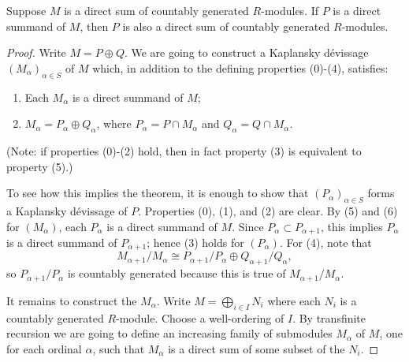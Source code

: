 \begin{theorem}
\label{theorem-kaplansky-direct-sum}
Suppose $M$ is a direct sum of countably generated $R$-modules.  If $P$ is a
direct summand of $M$, then $P$ is also a direct sum of countably generated
$R$-modules.
\end{theorem}

\begin{proof}
Write $M = P \oplus Q$.  We are going to construct a Kaplansky d\'evissage
$(M_{\alpha})_{\alpha \in S}$ of $M$ which, in addition to the defining
properties (0)-(4), satisfies:
\begin{enumerate}
\item[(5)] Each $M_{\alpha}$ is a direct summand of $M$;
\item[(6)] $M_{\alpha} = P_{\alpha} \oplus Q_{\alpha}$, where $P_{\alpha} =P
\cap M_{\alpha}$ and $Q_\alpha = Q \cap M_{\alpha}$.
\end{enumerate}
(Note: if properties (0)-(2) hold, then in fact property (3) is equivalent to
property (5).)

\medskip\noindent
To see how this implies the theorem, it is enough to show that
$(P_{\alpha})_{\alpha \in S}$ forms a Kaplansky d\'evissage of $P$.  Properties
(0), (1), and (2) are clear.  By (5) and (6) for $(M_{\alpha})$, each
$P_{\alpha}$ is a direct summand of $M$.  Since $P_{\alpha} \subset P_{\alpha +
1}$, this implies $P_{\alpha}$ is a direct summand of $P_{\alpha + 1}$; hence
(3) holds for $(P_{\alpha})$.  For (4), note that
$$
M_{\alpha + 1}/M_{\alpha} \cong P_{\alpha + 1}/P_{\alpha} \oplus
Q_{\alpha + 1}/Q_{\alpha},
$$
so $P_{\alpha + 1}/P_{\alpha}$ is countably generated because this is true of
$M_{\alpha + 1}/M_{\alpha}$.

\medskip\noindent
It remains to construct the $M_{\alpha}$.  Write $M = \bigoplus_{i \in I} N_i$
where each $N_i$ is a countably generated $R$-module.  Choose a well-ordering
of $I$.  By transfinite recursion we are going to define an increasing family
of submodules $M_{\alpha}$ of $M$, one for each ordinal $\alpha$, such that
$M_{\alpha}$ is a direct sum of some subset of the $N_i$.


\end{proof}
